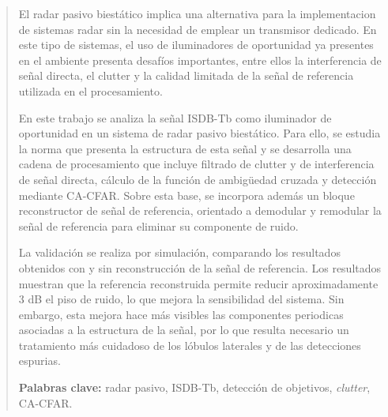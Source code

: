 \documentclass[12pt, letterpaper, oneside]{report}
\begin{document}
	\cleardoublepage
	\begin{abstract}

	El radar pasivo biestático implica una alternativa para la implementacion de sistemas radar sin la necesidad de emplear un transmisor dedicado. En este tipo de sistemas, el uso de iluminadores de oportunidad ya presentes en el ambiente presenta desafíos importantes, entre ellos la interferencia de señal directa, el clutter y la calidad limitada de la señal de referencia utilizada en el procesamiento.



	En este trabajo se analiza la señal ISDB-Tb como iluminador de oportunidad en un sistema de radar pasivo biestático. Para ello, se estudia la norma que presenta la estructura de esta señal y se desarrolla una cadena de procesamiento que incluye filtrado de clutter y de interferencia de señal directa, cálculo de la función de ambigüedad cruzada y detección mediante CA-CFAR. Sobre esta base, se incorpora además un bloque reconstructor de señal de referencia, orientado a demodular y remodular la señal de referencia para eliminar su componente de ruido.



	La validación se realiza por simulación, comparando los resultados obtenidos con y sin reconstrucción de la señal de referencia. Los resultados muestran que la referencia reconstruida permite reducir aproximadamente 3 dB el piso de ruido, lo que mejora la sensibilidad del sistema. Sin embargo, esta mejora hace más visibles las componentes periodicas asociadas a la estructura de la señal, por lo que resulta necesario un tratamiento más cuidadoso de los lóbulos laterales y de las detecciones espurias.

	\vspace{0.5cm}

	\textbf{Palabras clave:} radar pasivo, ISDB-Tb, detección de objetivos, \textit{clutter}, CA-CFAR.

	\end{abstract}
	\cleardoublepage

	
	
	
	
	
	
	

	\appendix
	\cleardoublepage

	
	
	\cleardoublepage
	\printbibliography[heading=bibintoc,title={Bibliografía}]


	
\end{document}
